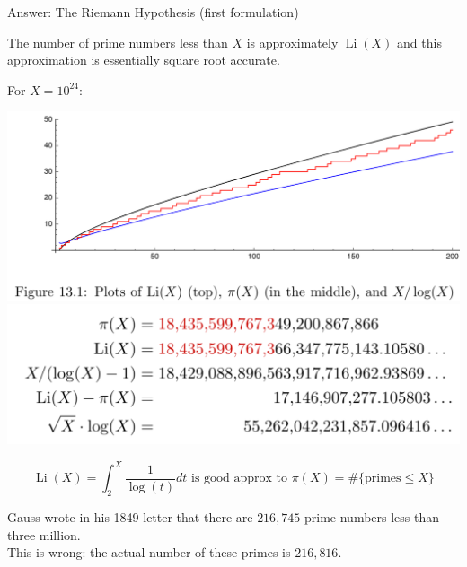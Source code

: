 \documentclass{beamer}
\DeclareMathOperator{\Li}{Li}
\begin{document}
\begin{frame}{Answer: The Riemann Hypothesis (first formulation)}
  \begin{block}{}
    The number of prime numbers less than $X$ is
    approximately $\Li(X)$ and this approximation is essentially square
    root accurate.
  \end{block}
\begin{flushright}
  \tiny For $X=10^{24}$:
\end{flushright}

  \begin{center}    \includegraphics[width=.47\textwidth]{pics/plot-pi-Li}
\includegraphics[width=.47\textwidth]{pics/ten24}
  \end{center}

  $$
  \Li(X) = \int_2^{X} \frac{1}{\log(t)} dt
  \text{ is good approx to }
  \pi(X) = \#\{\text{primes} \leq X\}
  $$

{\tiny Gauss wrote in his 1849 letter  that
there are $216{,}745$ prime numbers less than three million.\vspace{-1em}\\

This is
wrong: the actual number of these primes is $216{,}816$.}
\end{frame}
\end{document}
